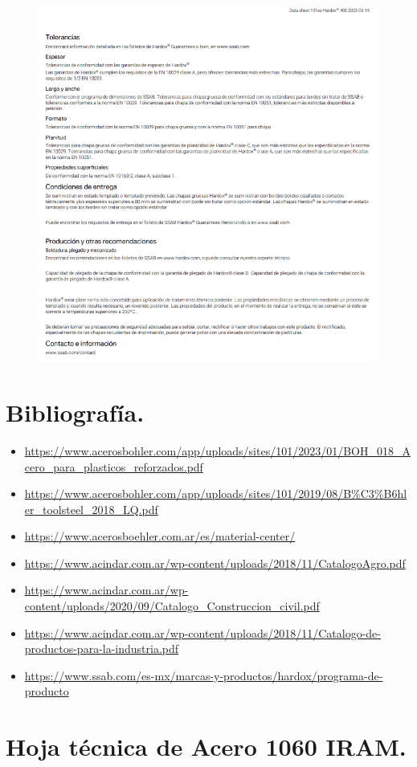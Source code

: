 \documentclass[12pt,a4paper]{article}
\begin{document}
\begin{enumerate}
\begin{figure}[H]
\begin{minipage}{0.49\textwidth}
    \end{minipage}
    \begin{minipage}{0.49\textwidth}
        \centering
        \includegraphics[width=\textwidth]{Inagenes para latex/36 der.png}
    \end{minipage}
\end{figure}
\end{enumerate}

\section{Bibliografía.}
\begin{itemize}
    \item \url{https://www.acerosbohler.com/app/uploads/sites/101/2023/01/BOH_018_Acero_para_plasticos_reforzados.pdf}
    \item \url{https://www.acerosbohler.com/app/uploads/sites/101/2019/08/B%C3%B6hler_toolsteel_2018_LQ.pdf}
    \item \url{https://www.acerosboehler.com.ar/es/material-center/}
    \item \url{https://www.acindar.com.ar/wp-content/uploads/2018/11/CatalogoAgro.pdf}
    \item \url{https://www.acindar.com.ar/wp-content/uploads/2020/09/Catalogo_Construccion_civil.pdf}
    \item \url{https://www.acindar.com.ar/wp-content/uploads/2018/11/Catalogo-de-productos-para-la-industria.pdf}
    \item \url{https://www.ssab.com/es-mx/marcas-y-productos/hardox/programa-de-producto}
\end{itemize}

\appendix
\section{Hoja técnica de Acero 1060 IRAM.}\label{anexo}

\end{document}
